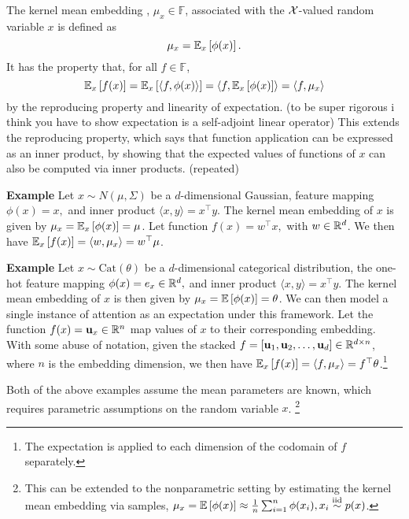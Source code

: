 \documentclass{article}
\begin{document}
The kernel mean embedding \citep{smola2007}, $\mu_x\in\mathbb{F}$,
associated with the $\mathcal{X}$-valued random variable $x$
is defined as
\begin{equation}
\label{eqn:kme}
\mu_x = \mathbb{E}_{x}\left[\phi(x)\right].
\end{equation}
It has the property that, for all $f \in \mathbb{F}$,
\begin{equation}
\label{eqn:expectation-inner-product}
\mathbb{E}_{x}\left[f(x)\right]
= \mathbb{E}_{x}\left[\langle f, \phi(x)\rangle\right]
= \langle f, \mathbb{E}_{x}\left[\phi(x)\right]\rangle
= \langle f, \mu_x \rangle
\end{equation}
by the reproducing property and linearity of expectation.
(to be super rigorous i think you have to show expectation is a self-adjoint linear operator)
This extends the reproducing property,
which says that function application can be expressed as an inner product,
by showing that the expected values of functions of $x$ can also
be computed via inner products. (repeated)

\textbf{Example}
Let $x\sim N(\mu, \Sigma)$ be a $d$-dimensional Gaussian,
feature mapping $\phi(x) = x,$
and inner product $\langle x, y\rangle = x^\top y$.
The kernel mean embedding of $x$ is given by $\mu_x = \mathbb{E}_{x}\left[\phi(x)\right] = \mu$.
Let function $f(x) = w^\top x,$ with $w\in\mathbb{R}^d$.
We then have $\mathbb{E}_{x}\left[f(x)\right] = \langle w, \mu_x \rangle = w^\top \mu$.

\textbf{Example}
Let $x\sim \textrm{Cat}(\theta)$ be a $d$-dimensional categorical distribution,
the one-hot feature mapping $\phi(x) = e_x\in\mathbb{R}^d,$
and inner product $\langle x, y\rangle = x^\top y$.
The kernel mean embedding of $x$ is then given by $\mu_x = \mathbb{E}\left[\phi(x)\right] = \theta$.
We can then model a single instance of attention as an expectation under this framework.
Let the function $f(x) = \mathbf{u}_x\in\mathbb{R}^n$ map values of $x$ to their corresponding embedding.
With some abuse of notation,
given the stacked $f = [\mathbf{u}_1, \mathbf{u}_2, \ldots, \mathbf{u}_d] \in \mathbb{R}^{d\times n}$,
where $n$ is the embedding dimension,
we then have
$\mathbb{E}_{x}\left[f(x)\right] = \langle f, \mu_x\rangle = f^\top\theta$.\footnote{
The expectation is applied to each dimension of the codomain of $f$ separately.
}

Both of the above examples assume the mean parameters are known,
which requires parametric assumptions on the random variable $x$.
\footnote{This can be extended to the nonparametric setting by estimating the
kernel mean embedding via samples,
$\mu_x = \mathbb{E}\left[\phi(x)\right] \approx \frac{1}{n}\sum_{i=1}^n \phi(x_i), x_i\stackrel{\textrm{iid}}{\sim} p(x)$.}
\end{document}
